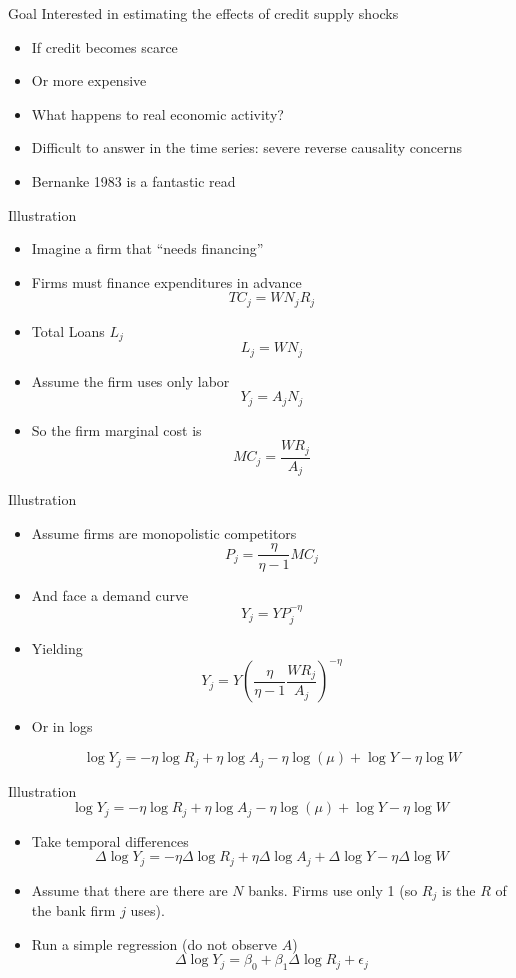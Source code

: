 \documentclass[english,xcolor=svgnames]{beamer}
\begin{document}
\begin{frame}{Goal}
Interested in estimating the effects of credit supply shocks
\begin{itemize}
\item If credit becomes scarce
\item Or more expensive
\item What happens to real economic activity?
\item Difficult to answer in the time series: severe reverse causality concerns
\item Bernanke 1983 is a fantastic read
\end{itemize}
\end{frame}

\begin{frame}{Illustration}
\begin{itemize}
\item Imagine a firm that ``needs financing''
\item Firms must finance expenditures in advance
$$TC_j = W N_j R_{j}$$
\item Total Loans $L_j$
$$L_j = W N_j$$
\item Assume the firm uses only labor
$$Y_j = A_j N_j$$
\item So the firm marginal cost is
$$ MC_j =  \frac{W R_j}{A_j}$$
\end{itemize}
\end{frame}

\begin{frame}{Illustration}
\begin{itemize}
\item Assume firms are monopolistic competitors
$$P_j = \frac{\eta}{\eta - 1} MC_j$$
\item And face a demand curve
$$Y_j = Y P_j^{-\eta}$$
\item Yielding 
$$Y_j = Y \left(\frac{\eta}{\eta - 1} \frac{WR_j}{A_j}\right)^{-\eta}$$
\item Or in logs

$$\log Y_j = -\eta \log R_j +  \eta \log A_j - \eta \log (\mu) + \log Y  - \eta \log W$$
\end{itemize}
\end{frame}

\begin{frame}{Illustration}
$$\log Y_j = -\eta \log R_j +  \eta \log A_j - \eta \log (\mu) + \log Y  - \eta \log W$$
\begin{itemize}
\item Take temporal differences
$$\Delta \log Y_j = -\eta\Delta \log R_j +  \eta \Delta  \log A_j  + \Delta \log Y  - \eta \Delta \log W$$
\item Assume that there are there are $N$ banks. Firms use only 1 (so $R_j$ is the $R$ of the bank firm $j$ uses).
\item Run a simple regression (do not observe $A$)
$$\Delta \log Y_j = \beta_0 + \beta_1 \Delta \log R_j  + \epsilon_j $$
\end{itemize}
\end{frame}
\end{document}
